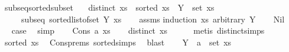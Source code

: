 \begin{isabellebody}
\isanewline
{}\isamarkupfalse%
\ subseq{\isacharunderscore}{\kern0pt}sorted{\isacharunderscore}{\kern0pt}subset{\isacharcolon}{\kern0pt}\isanewline
\ \ \ {\isachardoublequoteopen}distinct\ xs{\isachardoublequoteclose}\ \ {\isachardoublequoteopen}sorted\ xs{\isachardoublequoteclose}\ \ {\isachardoublequoteopen}Y\ {\isasymsubseteq}\ set\ xs{\isachardoublequoteclose}\isanewline
\ \ \ \ \ {\isachardoublequoteopen}subseq\ {\isacharparenleft}{\kern0pt}sorted{\isacharunderscore}{\kern0pt}list{\isacharunderscore}{\kern0pt}of{\isacharunderscore}{\kern0pt}set\ Y{\isacharparenright}{\kern0pt}\ xs{\isachardoublequoteclose}\isanewline
%
\isadelimproof
\ \ %
\endisadelimproof
%
\isatagproof
{}\isamarkupfalse%
\ assms\isanewline
{}\isamarkupfalse%
{\isacharparenleft}{\kern0pt}induction\ {\isachardoublequoteopen}xs{\isachardoublequoteclose}\ arbitrary{\isacharcolon}{\kern0pt}\ Y{\isacharparenright}{\kern0pt}\isanewline
\ \ \isamarkupfalse%
\ Nil\isanewline
\ \ \isamarkupfalse%
\ \isamarkupfalse%
\ {\isacharquery}{\kern0pt}case\ \isamarkupfalse%
\ simp\isanewline
{}\isamarkupfalse%
\isanewline
\ \ \isamarkupfalse%
\ {\isacharparenleft}{\kern0pt}Cons\ a\ xs{\isacharparenright}{\kern0pt}\isanewline
\ \ \isamarkupfalse%
\ {}{\isacharcolon}{\kern0pt}{\isachardoublequoteopen}distinct\ xs{\isachardoublequoteclose}\isanewline
\ \ \ \ \isamarkupfalse%
\ {\isacharparenleft}{\kern0pt}metis\ distinct{\isachardot}{\kern0pt}simps{\isacharparenleft}{\kern0pt}{}{\isacharparenright}{\kern0pt}{\isacharparenright}{\kern0pt}\isanewline
\ \ \isamarkupfalse%
\ {}{\isacharcolon}{\kern0pt}{\isachardoublequoteopen}sorted\ xs{\isachardoublequoteclose}\ \isamarkupfalse%
\ Cons{\isachardot}{\kern0pt}prems{\isacharparenleft}{\kern0pt}{}{\isacharparenright}{\kern0pt}\ sorted{\isacharunderscore}{\kern0pt}simps{\isacharparenleft}{\kern0pt}{}{\isacharparenright}{\kern0pt}\ \isamarkupfalse%
\ blast\isanewline
\ \ \isamarkupfalse%
\ {}{\isacharcolon}{\kern0pt}{\isachardoublequoteopen}Y\ {\isacharminus}{\kern0pt}\ {\isacharbraceleft}{\kern0pt}a{\isacharbraceright}{\kern0pt}\ {\isasymsubseteq}\ set\ xs{\isachardoublequoteclose}\ \isamarkupfalse%

\end{isabellebody}
